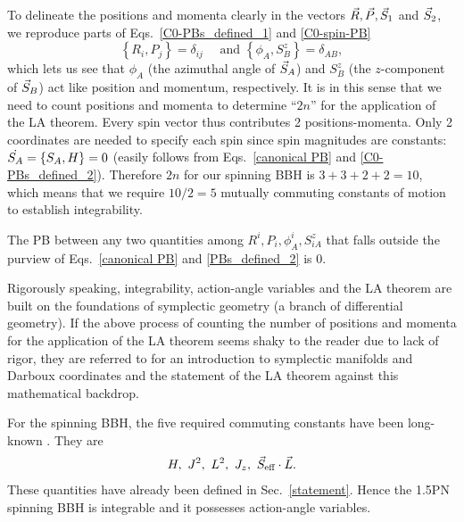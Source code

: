To delineate the positions and momenta clearly in 
the vectors $\vec{R}, \vec{P}, \vec{S}_1$ and $\vec{S}_2$, 
we reproduce parts of
Eqs.~\eqref{C0-PBs_defined_1} and \eqref{C0-spin-PB} 
\begin{equation}
\left\{R_{i}, P_{j}\right\}=\delta_{ij} \quad \text { and }   \left\{\phi_{A}, S_{B}^{z}\right\}=\delta_{A B},    \label{canonical PB}
\end{equation}
which lets us see that $\phi_A$ (the azimuthal 
angle of $\vec{S}_A$) and $S^z_B$ (the $z$-component of 
$\vec{S}_B$) act like position and momentum, respectively.
 It is in this sense that we need to 
count positions and momenta to determine ``$2n$''
 for the application of the LA theorem.
Every spin vector thus contributes 2 positions-momenta.
Only 2 coordinates are needed to specify each spin
since spin magnitudes are constants: $\dot{S_A} = \left\lbrace S_A, H \right\rbrace = 0$
(easily follows from Eqs.~\eqref{canonical PB} 
and \eqref{C0-PBs_defined_2}).
Therefore $2n$ for our spinning BBH
is $3 + 3+ 2+2 = 10$, which means that we require $10/2 = 5$ mutually commuting constants of motion
to establish integrability.


The PB between 
any two quantities
among $R^i, P_i, \phi^i_A, S^z_{iA}$ that falls outside the purview of Eqs.~\eqref{canonical PB} and \eqref{PBs_defined_2} is 0.


\newpage

\hfill \break


\begin{definition}[label=def:B]
Rigorously speaking,
integrability, action-angle variables and the LA theorem are built
on the foundations of symplectic geometry (a branch of differential geometry).
If the above process of counting the number of positions and momenta
for the  application of the LA theorem
seems shaky to the reader due to lack of rigor,
they are referred to 
\cite{jose, arnold, marsden_1, marsden_2} for an introduction to symplectic manifolds
and Darboux coordinates and the statement of the LA theorem against this mathematical backdrop.
\end{definition}

\hfill \break



For the spinning BBH, the five required 
commuting constants have been long-known \cite{Damour:2001tu}.
They are 
\begin{align}
H,~~~~~~~ J^2,~~~~~~~ L^2,~~~~~~~ J_z,~~~~~~~ \vec{S}_{\text{eff}}\cdot \vec{L}.    \label{CCs}
\end{align}
These
quantities have already been defined in Sec.~\ref{statement}.
Hence the 1.5PN spinning BBH is integrable and it possesses action-angle variables. 

















